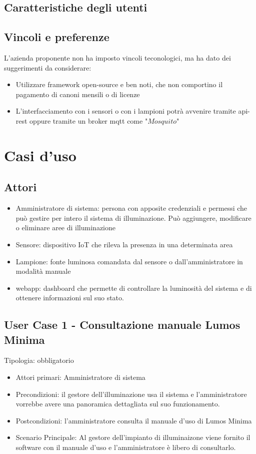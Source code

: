 \documentclass[12pt]{article}
\begin{document}
\subsection{Caratteristiche degli utenti}

\subsection{Vincoli e preferenze}
L'azienda proponente non ha imposto vincoli teconologici, ma ha dato dei suggerimenti da considerare:
\begin{itemize}
	\item Utilizzare framework open-source e ben noti, che non comportino il pagamento di canoni mensili o di licenze
	\item L'interfacciamento con i sensori o con i lampioni potrà avvenire tramite api-rest oppure tramite un broker mqtt come "$Mosquito$"
\end{itemize}

\section{Casi d'uso}
\subsection{Attori}
\begin{itemize}
	\item Amministratore di sistema: persona con apposite credenziali e permessi che può gestire per intero il sistema di illuminazione. Può aggiungere, modificare o eliminare aree di illuminazione
	\item Sensore: dispositivo IoT che rileva la presenza in una determinata area
	\item Lampione: fonte luminosa comandata dal sensore o dall'amministratore in modalità manuale
	\item webapp: dashboard che permette di controllare la luminosità del sistema e di ottenere informazioni sul suo stato.
\end{itemize}
\subsection{User Case 1 - Consultazione manuale Lumos Minima}
Tipologia: obbligatorio
\begin{itemize}
	\item Attori primari: Amministratore di sistema
	\item Precondizioni: il gestore dell'illuminazione usa il sistema e l'amministratore vorrebbe avere una panoramica dettagliata sul suo funzionamento.
	\item Postcondizioni: l'amministratore consulta il manuale d'uso di Lumos Minima
	\item Scenario Principale: Al gestore dell'impianto di illuminaizone viene fornito il software con il manuale d'uso e l'amministratore è libero di consultarlo.
\end{itemize}
\end{document}
